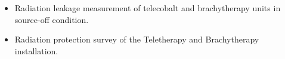 \begin{itemize}
    \item Radiation leakage measurement of telecobalt and brachytherapy units in source-off condition.
    \item Radiation protection survey of the Teletherapy and Brachytherapy installation.
\end{itemize}